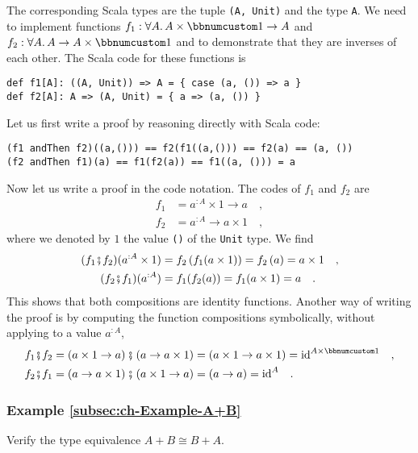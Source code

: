 The corresponding Scala types are the tuple \lstinline!(A, Unit)!
and the type \lstinline!A!. We need to implement functions $f_{1}:\forall A.\,A\times\bbnum 1\rightarrow A$
and $f_{2}:\forall A.\,A\rightarrow A\times\bbnum 1$ and to demonstrate
that they are inverses of each other. The Scala code for these functions
is
\begin{lstlisting}
def f1[A]: ((A, Unit)) => A = { case (a, ()) => a }
def f2[A]: A => (A, Unit) = { a => (a, ()) }
\end{lstlisting}
Let us first write a proof by reasoning directly with Scala code:
\begin{lstlisting}
(f1 andThen f2)((a,())) == f2(f1((a,())) == f2(a) == (a, ())
(f2 andThen f1)(a) == f1(f2(a)) == f1((a, ())) = a
\end{lstlisting}
Now let us write a proof in the code notation. The codes of $f_{1}$
and $f_{2}$ are
\begin{align*}
f_{1} & =a^{:A}\times1\rightarrow a\quad,\\
f_{2} & =a^{:A}\rightarrow a\times1\quad,
\end{align*}
where we denoted by $1$ the value \lstinline!()! of the \lstinline!Unit!
type. We find
\begin{align*}
(f_{1}\bef f_{2})(a^{:A}\times1) & =f_{2}\left(f_{1}(a\times1)\right)=f_{2}\left(a\right)=a\times1\quad,\\
(f_{2}\bef f_{1})(a^{:A}) & =f_{1}(f_{2}(a))=f_{1}(a\times1)=a\quad.
\end{align*}
This shows that both compositions are identity functions. Another
way of writing the proof is by computing the function compositions
symbolically, without applying to a value $a^{:A}$,
\begin{align*}
f_{1}\bef f_{2} & =\left(a\times1\rightarrow a\right)\bef\left(a\rightarrow a\times1\right)=\left(a\times1\rightarrow a\times1\right)=\text{id}^{A\times\bbnum 1}\quad,\\
f_{2}\bef f_{1} & =\left(a\rightarrow a\times1\right)\bef\left(a\times1\rightarrow a\right)=\left(a\rightarrow a\right)=\text{id}^{A}\quad.
\end{align*}


\subsubsection{Example \label{subsec:ch-Example-A+B}\ref{subsec:ch-Example-A+B}}

Verify the type equivalence $A+B\cong B+A$.

